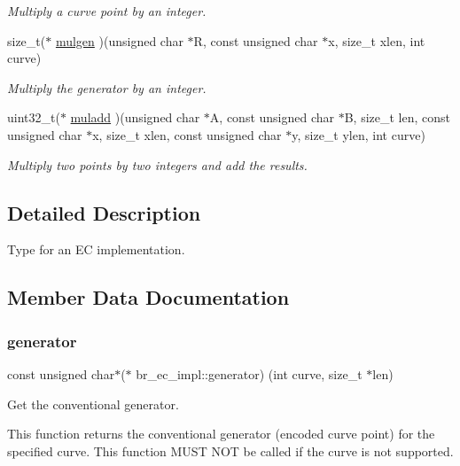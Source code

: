 \begin{DoxyCompactItemize}
\begin{DoxyCompactList}\small\item\em Multiply a curve point by an integer. \end{DoxyCompactList}\item 
size\+\_\+t($\ast$ \hyperlink{structbr__ec__impl_a54a7c34d0e99d453bbb588ae8ad813e1}{mulgen} )(unsigned char $\ast$R, const unsigned char $\ast$x, size\+\_\+t xlen, int curve)
\begin{DoxyCompactList}\small\item\em Multiply the generator by an integer. \end{DoxyCompactList}\item 
uint32\+\_\+t($\ast$ \hyperlink{structbr__ec__impl_afc5304c88c29ed502f0f0a8a77cec71a}{muladd} )(unsigned char $\ast$A, const unsigned char $\ast$B, size\+\_\+t len, const unsigned char $\ast$x, size\+\_\+t xlen, const unsigned char $\ast$y, size\+\_\+t ylen, int curve)
\begin{DoxyCompactList}\small\item\em Multiply two points by two integers and add the results. \end{DoxyCompactList}\end{DoxyCompactItemize}


\subsection{Detailed Description}
Type for an EC implementation. 

\subsection{Member Data Documentation}
\mbox{\label{structbr__ec__impl_aefb8a81a4434ba81fd669874d9bc6ab8}} 
\subsubsection{\texorpdfstring{generator}{generator}}
{\footnotesize\ttfamily const unsigned char$\ast$($\ast$ br\+\_\+ec\+\_\+impl\+::generator) (int curve, size\+\_\+t $\ast$len)}



Get the conventional generator. 

This function returns the conventional generator (encoded curve point) for the specified curve. This function M\+U\+ST N\+OT be called if the curve is not supported.


